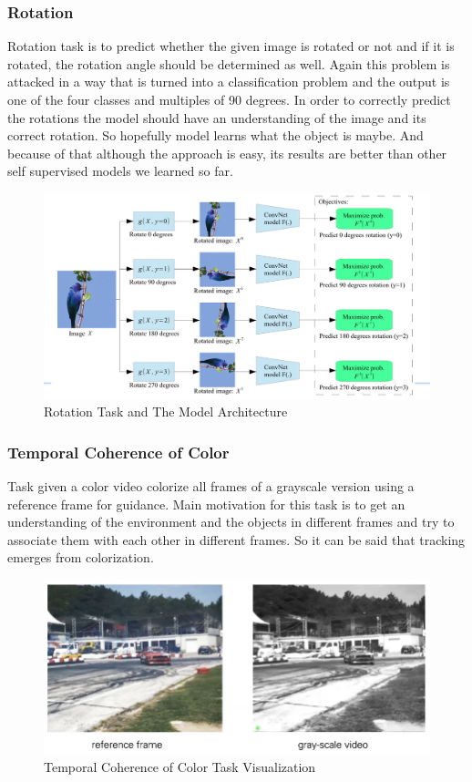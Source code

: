 \documentclass{article}
\begin{document}
 
\subsubsection{Rotation}
 
Rotation task is to predict whether the given image is rotated or not and
if it is rotated, the rotation angle should be determined as well.
Again this problem is attacked in a way that is turned into a classification
problem and the output is one of the four classes and multiples of 90 degrees.
In order to correctly predict the rotations the model should have an understanding
of the image and its correct rotation. So hopefully model learns what the object is
maybe. And because of that although the approach is easy, its results are better
than other self supervised models we learned so far.
\begin{figure}[H]
   \centering
   \includegraphics[width=0.8\linewidth]{figures/rotation_model.png}
   \caption{Rotation Task and The Model Architecture \cite{DBLP:journals/corr/abs-1803-07728}}
   \label{fig:rotation_model}
   \end{figure}
 
 
\subsubsection{Temporal Coherence of Color}
Task given a color video colorize all frames of a grayscale version
using a reference frame for guidance.
Main motivation for this task is to get an understanding of
the environment and the objects in different frames and
try to associate them with each other in different frames.
So it can be said that tracking emerges from colorization.
 
\begin{figure}[H]
   \centering
   \includegraphics[width=0.8\linewidth]{figures/temporal_coherence_color.png}
   \caption{Temporal Coherence of Color Task Visualization}
   \label{fig:temporal_coherence_color}
   \end{figure}
 
\end{document}
